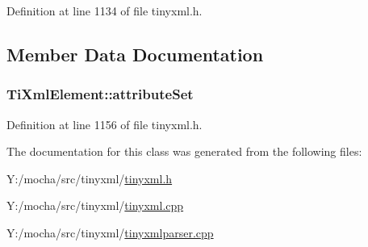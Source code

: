 Definition at line 1134 of file tinyxml.h.



\subsection{Member Data Documentation}
\hypertarget{class_ti_xml_element_a56d7e69380c3cc938bf213d2857791b2}{
\subsubsection[{attributeSet}]{ {\bf TiXmlElement::attributeSet}}}
\label{class_ti_xml_element_a56d7e69380c3cc938bf213d2857791b2}


Definition at line 1156 of file tinyxml.h.



The documentation for this class was generated from the following files:\begin{DoxyCompactItemize}
\item 
Y:/mocha/src/tinyxml/\hyperlink{tinyxml_8h}{tinyxml.h}\item 
Y:/mocha/src/tinyxml/\hyperlink{tinyxml_8cpp}{tinyxml.cpp}\item 
Y:/mocha/src/tinyxml/\hyperlink{tinyxmlparser_8cpp}{tinyxmlparser.cpp}\end{DoxyCompactItemize}
